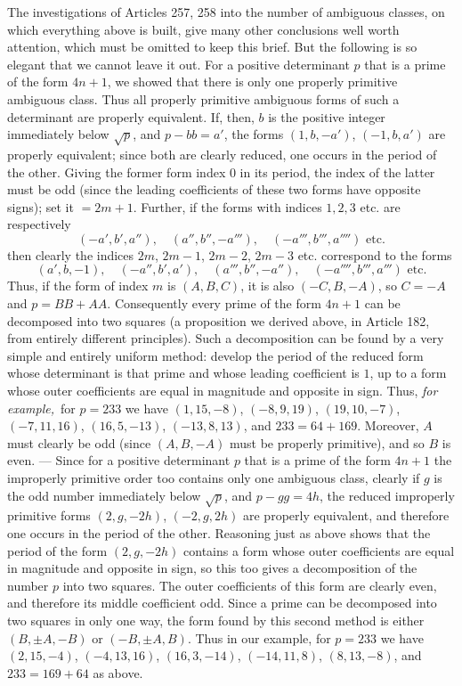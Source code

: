 The investigations of Articles 257, 258 into the number of ambiguous classes, on which everything above is built, give many other conclusions well worth attention, which must be omitted to keep this brief. But the following is so elegant that we cannot leave it out. For a positive determinant $p$ that is a prime of the form $4n+1$, we showed that there is only one properly primitive ambiguous class. Thus all properly primitive ambiguous forms of such a determinant are properly equivalent. If, then, $b$ is the positive integer immediately below $\surd p$, and $p-bb
=a'$, the forms $(1, b, -a')$, $(-1, b, a')$ are properly equivalent; since both are clearly reduced, one occurs in the period of the other. Giving the former form index $0$ in its period, the index of the latter must be odd (since the leading coefficients of these two forms have opposite signs); set it $=2m+1$. Further, if the forms with indices $1, 2, 3$ etc. are respectively
\[
(-a', b', a''),\quad (a'', b'', -a'''),\quad (-a''', b''', a'''')\text{ etc.}
\]
then clearly the indices $2m$, $2m-1$, $2m-2$, $2m-3$ etc. correspond to the forms
\[
(a', b, -1),\quad (-a'', b', a'),\quad (a''', b'', -a''),\quad (-a'''', b''', a''')\text{ etc.}
\]
Thus, if the form of index $m$ is $(A, B, C)$, it is also $(-C, B, -A)$, so $C=-A$ and $p=BB+AA$. Consequently every prime of the form $4n+1$ can be decomposed into two squares (a proposition we derived above, in Article 182, from entirely different principles). Such a decomposition can be found by a very simple and entirely uniform method: develop the period of the reduced form whose determinant is that prime and whose leading coefficient is $1$, up to a form whose outer coefficients are equal in magnitude and opposite in sign. Thus, \textit{for example,}\ for $p=233$ we have $(1, 15, -8)$, $(-8, 9, 19)$, $(19, 10, -7)$, $(-7, 11, 16)$, $(16, 5, -13)$, $(-13, 8, 13)$, and $233=64+169$. Moreover, $A$ must clearly be odd (since $(A, B, -A)$ must be properly primitive), and so $B$ is even. --- Since for a positive determinant $p$ that is a prime of the form $4n+1$ the improperly primitive order too contains only one ambiguous class, clearly if $g$ is the
odd number immediately below $\surd p$, and $p-gg=4h$, the reduced improperly primitive forms $(2, g, -2h)$, $(-2, g, 2h)$ are properly equivalent, and therefore one occurs in the period of the other. Reasoning just as above shows that the period of the form $(2, g, -2h)$ contains a form whose outer coefficients are equal in magnitude and opposite in sign, so this too gives a decomposition of the number $p$ into two squares. The outer coefficients of this form are clearly even, and therefore its middle coefficient odd. Since a prime can be decomposed into two squares in only one way, the form found by this second method is either $(B, \pm A, -B)$ or $(-B, \pm A, B)$. Thus in our example, for $p=233$ we have $(2, 15, -4)$, $(-4, 13, 16)$, $(16, 3, -14)$, $(-14, 11, 8)$, $(8, 13, -8)$, and $233=169+64$ as above.
